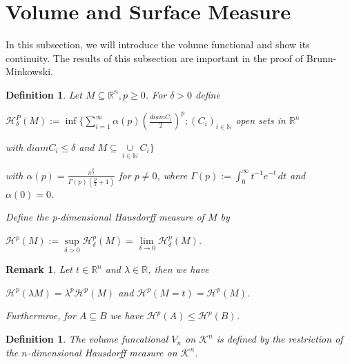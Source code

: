 \documentclass[a4paper]{book}
\newtheorem{remark}[theorem]{Remark}%
\newtheorem{definition}[theorem]{Definition}%
\numberwithin{theorem}{section}%
\begin{document}
\section{Volume and Surface Measure}
In this subsection, we will introduce the volume functional and show its continuity. The results of this subsection are important in the proof of Brunn-Minkowski.

\begin{definition}
    Let $M\subseteq\mathbb{R}^{n}, p\geq0$. For $\delta>0$ define
    \begin{center}
        $\displaystyle \mathscr{H}_{\delta}^{P}(M):=\inf\{\sum\limits_{i=1}^{\infty}\alpha(p)(\frac{diam C_{i}}{2})^{p};(C_{i})_{i\in\mathbb{N}}$ open sets in $\mathbb{R}^n$

        \hspace{1cm}with $diam C_{i}\leq\delta$ and $M\subseteq\underset{i\in\mathbb{N}}{\cup}{C_{i}}\}$
    \end{center}
    with $\alpha(p)=\frac{\pi^{\frac{p}{2}}}{\Gamma(p)(\frac{p}{2}+1)}$ for $p\neq0$, where $\Gamma(p):=\int_{0}^{\infty}t^{-1}e^{-t}\,dt$ and $\alpha(0)=0$.
    
    Define the p-dimensional Hausdorff measure of $M$ by
    \begin{center}
        $\mathscr{H}^{p}(M):=\underset{\delta>0}{\sup}\mathscr{H}_{\delta}^{p}(M)=\underset{\delta\to0}{\lim}\mathscr{H}_{\delta}^{p}(M)$.
    \end{center}
\end{definition}

\begin{remark}
    Let $t\in\mathbb{R}^{n}$ and $\lambda\in\mathbb{R}$, then we have
    \begin{center}
        $\mathscr{H}^{p}(\lambda M)=\lambda^{p}\mathscr{H}^{p}(M)$ and $\mathscr{H}^{p}(M=t)=\mathscr{H}^{p}(M)$.
    \end{center}
    Furthermroe, for $A\subseteq B$ we have $\mathscr{H}^{p}(A)\leq\mathscr{H}^{p}(B)$.
\end{remark}

\begin{definition}
    The volume funcational $V_{n}$ on $\mathscr{K}^{n}$ is defined by the restriction of the $n$-dimensional Hausdorff measure on $\mathscr{K}^{n}$.
\end{definition}
\end{document}
